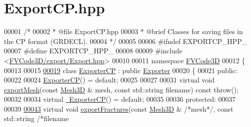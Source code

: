 \hypertarget{ExportCP_8hpp_source}{}\section{Export\+C\+P.\+hpp}
\label{ExportCP_8hpp_source}

\begin{DoxyCode}
00001 \textcolor{comment}{/*}
00002 \textcolor{comment}{ * @file ExportCP.hpp}
00003 \textcolor{comment}{ * @brief Classes for saving files in the CP format (GRDECL).}
00004 \textcolor{comment}{ */}
00005 
00006 \textcolor{preprocessor}{#ifndef EXPORTCP\_HPP\_}
00007 \textcolor{preprocessor}{#define EXPORTCP\_HPP\_}
00008 
00009 \textcolor{preprocessor}{#include <\hyperlink{Export_8hpp}{FVCode3D/export/Export.hpp}>}
00010 
00011 \textcolor{keyword}{namespace }\hyperlink{namespaceFVCode3D}{FVCode3D}
00012 \{
00013 
00015 
\hypertarget{ExportCP_8hpp_source.tex_l00019}{}\hyperlink{classFVCode3D_1_1ExporterCP}{00019} \textcolor{keyword}{class }\hyperlink{classFVCode3D_1_1ExporterCP}{ExporterCP} : \textcolor{keyword}{public} \hyperlink{classFVCode3D_1_1Exporter}{Exporter}
00020 \{
00021 \textcolor{keyword}{public}:
00022 
00024     \hyperlink{classFVCode3D_1_1ExporterCP_acb1333c76b0f94297d22f1f457ff83bf}{ExporterCP}() = \textcolor{keywordflow}{default};
00025 
00027 
00031     \textcolor{keyword}{virtual} \textcolor{keywordtype}{void} \hyperlink{classFVCode3D_1_1ExporterCP_a710defb3e6ef55d69fea4833920b755b}{exportMesh}(\textcolor{keyword}{const} \hyperlink{classFVCode3D_1_1Mesh3D}{Mesh3D} & mesh, \textcolor{keyword}{const} std::string filename) \textcolor{keyword}{const} \textcolor{keywordflow}{throw}();
00032 
00034     \textcolor{keyword}{virtual} \hyperlink{classFVCode3D_1_1ExporterCP_ab8c6ebe217f72f2fb2e1817279d0b12d}{~ExporterCP}() = \textcolor{keywordflow}{default};
00035 
00036 \textcolor{keyword}{protected}:
00037 
00039 
\hypertarget{ExportCP_8hpp_source.tex_l00043}{}\hyperlink{classFVCode3D_1_1ExporterCP_a7d325ef094642f2b46663ef40e038f17}{00043}     \textcolor{keyword}{virtual} \textcolor{keywordtype}{void} \hyperlink{classFVCode3D_1_1ExporterCP_a7d325ef094642f2b46663ef40e038f17}{exportFractures}(\textcolor{keyword}{const} \hyperlink{classFVCode3D_1_1Mesh3D}{Mesh3D} & \textcolor{comment}{/*mesh*/}, \textcolor{keyword}{const} std::string \textcolor{comment}{/*filename
}
\end{DoxyCode}
